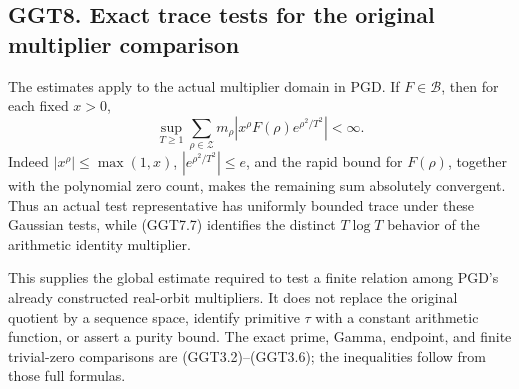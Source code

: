 \subsection{GGT8. Exact trace tests for the original multiplier
comparison}\label{ggt8.-exact-trace-tests-for-the-original-multiplier-comparison}

The estimates apply to the actual multiplier domain in PGD. If
\(F\in\mathcal B\), then for each fixed \(x>0\), \[
\sup_{T\ge1}
\sum_{\rho\in\mathscr Z}m_\rho
|x^\rho F(\rho)e^{\rho^2/T^2}|<\infty.
\tag{GGT8.1}
\] Indeed \(|x^\rho|\le\max(1,x)\), \(|e^{\rho^2/T^2}|\le e\), and the
rapid bound for \(F(\rho)\), together with the polynomial zero count,
makes the remaining sum absolutely convergent. Thus an actual test
representative has uniformly bounded trace under these Gaussian tests,
while (GGT7.7) identifies the distinct \(T\log T\) behavior of the
arithmetic identity multiplier.

This supplies the global estimate required to test a finite relation
among PGD's already constructed real-orbit multipliers. It does not
replace the original quotient by a sequence space, identify primitive
\(\tau\) with a constant arithmetic function, or assert a purity bound.
The exact prime, Gamma, endpoint, and finite trivial-zero comparisons
are (GGT3.2)--(GGT3.6); the inequalities follow from those full
formulas.
